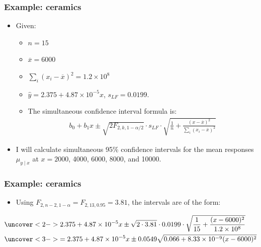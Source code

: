 \documentclass[handout]{beamer}\usepackage{graphicx, color}
\providecommand{\ov}[1]{\overline{#1}}
\providecommand{\wh}[1]{\widehat{#1}}
\numberwithin{equation}{section}
\begin{document}
\begin{frame}
\frametitle{Example: ceramics}
\begin{itemize}
\item Given:
\begin{itemize}
\pause \item $n = 15$
\pause \item $\ov{x} = 6000$
\pause \item $\sum_i(x_i - \ov{x})^2 = 1.2\times 10^8$
\pause \item $\wh{y} = 2.375 + 4.87 \times 10^{-5} x$, $s_{LF} = 0.0199$.
\pause \item The simultaneous confidence interval formula is:
\pause \begin{align*}
b_0 + b_1 x \pm \sqrt{2 F_{2, k, 1 - \alpha/2}}  \cdot s_{LF} \cdot \sqrt{ \frac{1}{n} + \frac{(x - \ov{x})^2}{\sum_i(x_i - \ov{x})^2}}
\end{align*}
\end{itemize}
\pause \item I will calculate simultaneous 95\% confidence intervals for the mean responses $\mu_{y \mid x}$ at $x = 2000$, 4000, 6000, 8000, and 10000.
\end{itemize}
\end{frame}

\begin{frame}
\frametitle{Example: ceramics} \small
\begin{itemize}
\item Using $F_{2, n-2, 1 - \alpha} = F_{2, 13, 0.95} = 3.81$, the intervals are of the form:
\end{itemize}
\begin{align*}
&\uncover<2->{2.375 + 4.87 \times 10^{-5} x \pm \sqrt{2 \cdot 3.81} \cdot 0.0199 \cdot \sqrt{ \frac{1}{15} + \frac{(x - 6000)^2}{1.2 \times 10^8}}} \\
&\uncover<3->{= 2.375 + 4.87 \times 10^{-5} x \pm 0.0549 \sqrt{0.066 + 8.33 \times 10^{-9} (x - 6000)^2}}
\end{align*}

\begin{center}
\end{center}
\end{frame}
\end{document}
